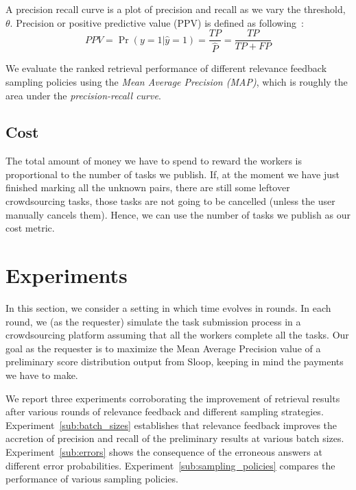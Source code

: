 A precision recall curve is a plot of precision and recall as we vary the
threshold, $\theta$. Precision or positive predictive value (PPV) is defined as
following~\cite{manning2008introduction}: $$PPV = \Pr{(y=1|\hat{y}=1)} =
\frac{TP}{\hat{P}} = \frac{TP}{TP+FP}$$

We evaluate the ranked retrieval performance of different relevance feedback
sampling policies using the \emph{Mean Average Precision (MAP)}, which is
roughly the area under the \emph{precision-recall curve}.

\subsection{Cost} %
\label{sub:cost}

The total amount of money we have to spend to reward the workers is
proportional to the number of tasks we publish. If, at the moment we
have just finished marking all the unknown pairs, there are still some leftover
crowdsourcing tasks, those tasks are not going to be cancelled (unless the user
manually cancels them). Hence, we can use the number of tasks we publish as our
cost metric.


\section{Experiments} %
\label{sec:experiments}

In this section, we consider a setting in which time evolves in rounds. In each
round, we (as the requester) simulate the task submission process in a
crowdsourcing platform assuming that all the workers complete all the tasks.
Our goal as the requester is to maximize the Mean Average Precision value of a
preliminary score distribution output from Sloop, keeping in mind the payments
we have to make.

We report three experiments corroborating the improvement of retrieval
results after various rounds of relevance feedback and different sampling
strategies.  Experiment~\ref{sub:batch_sizes} establishes that relevance
feedback improves the accretion of precision and recall of the preliminary
results at various batch sizes.  Experiment~\ref{sub:errors} shows the
consequence of the erroneous answers at different error probabilities.
Experiment~\ref{sub:sampling_policies} compares the performance of various
sampling policies.

